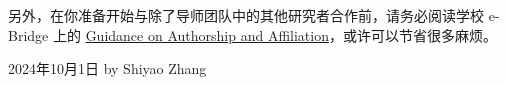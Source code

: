 \vspace{\baselineskip}

另外，在你准备开始与除了导师团队中的其他研究者合作前，请务必阅读学校 e-Bridge 上的 \href{https://ebridge.xjtlu.edu.cn/urd/sits.urd/run/SIW_FILE_LOAD.start_url?08F2CBCAE3174A7365Px9_5kBfG0_iGiWj8zb7ybwaO0YBYc8NiKlPG93xyQA9X2SClXOLLd7-_EgF50aijROwT-rdSGIUIbRRzhFu-76Ha0g2HymUr0S-Fgjm1DXP9RO1GhGzx5-akgsDSMBlNhR7vpib85F9vlqa67My7RKHFSiluZueFy52YCBtintt0wDTKmx4fCjkWnldNDaxo6ZVD2L572Us3V-FOv485wYZUNUn5NLzgR0pAaU7aiKnTVJY8Aa2su5F4u7o-rNPJPety3jwwJ4O1v1agpDZLZ1it1H5fWn3IgLNaWlUh84YpxNRXyTW1kIwrX0r4-dT1eoxdZUAFrJhaBwz6E0w}{Guidance on Authorship and Affiliation}，或许可以节省很多麻烦。

\begin{flushright}
    2024年10月1日 by Shiyao Zhang
\end{flushright}